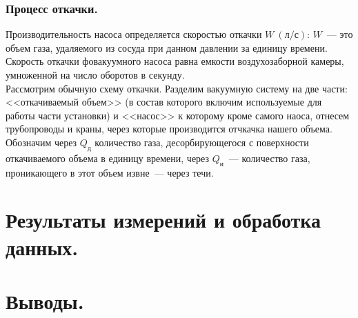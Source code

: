 \documentclass[a4paper,11pt]{article}
\begin{document}
\subsubsection{Процесс откачки.}
Производительность насоса определяется скоростью откачки $W\ (л/с)$: $W$~--- это объем газа, удаляемого из сосуда при данном давлении за единицу времени. Скорость откачки фовакуумного насоса равна емкости воздухозаборной камеры, умноженной на число оборотов в секунду.\\
Рассмотрим обычную схему откачки. Разделим вакуумную систему на две части: <<откачиваемый объем>> (в состав которого включим используемые для работы части установки) и <<насос>> к которому кроме самого наоса, отнесем трубопроводы и краны, через которые производится отчкачка нашего объема. Обозначим через $Q_{д}$ количество газа, десорбирующегося с поверхности откачиваемого объема в единицу времени, через $Q_{и}$~--- количество газа, проникающего в этот объем извне~--- через течи.
\section{Результаты измерений и обработка данных.}
\section{Выводы.}
\end{document}

